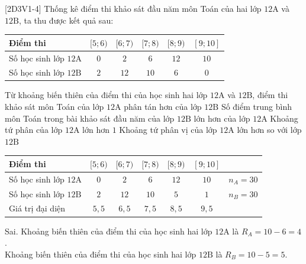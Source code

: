 \begin{ex}%
[2D3V1-4]%
	Thống kê điểm thi khảo sát đầu năm môn Toán của hai lớp $12\mathrm{A}$ và $12\mathrm{B}$, ta thu được kết quả sau: 
	\begin{center}
		\begin{tabular}{|l|c|c|c|c|c|}
			\hline Điểm thi & $[5 ; 6)$ & $[6 ; 7)$ & $[7 ; 8)$ & $[8 ; 9)$ & $[9 ; 10]$ \\
			\hline 
			Số học sinh lớp $12\mathrm{A}$ & $0$ & $2$ & $6$ & $12$ & $10$ \\
			\hline 
			Số học sinh lớp $12\mathrm{B}$ & $2$ & $12$ & $10$ & $6$ & $0$ \\
			\hline
		\end{tabular}
	\end{center}
	\choiceTF
	{Từ khoảng biến thiên của điểm thi của học sinh hai lớp $12\mathrm{A}$ và $12\mathrm{B}$, điểm thi khảo sát môn Toán của lớp $12\mathrm{A}$ phân tán hơn của lớp $12\mathrm{B}$}
	{Số điểm trung bình môn Toán trong bài khảo sát đầu năm của lớp $12\mathrm{B}$ lớn hơn của lớp $12\mathrm{A}$}
	{\True Khoảng tứ phân của lớp $12\mathrm{A}$ lớn hơn $1$}
	{\True Khoảng tứ phân vị của lớp $12\mathrm{A}$ lớn hơn so với lớp $12\mathrm{B}$}
	\loigiai
	{
		\begin{center}
			\begin{tabular}{|l|c|c|c|c|c|c|}
				\hline Điểm thi & $[5 ; 6)$ & $[6 ; 7)$ & $[7 ; 8)$ & $[8 ; 9)$ & $[9 ; 10]$ & \\
				\hline 
				Số học sinh lớp $12\mathrm{A}$ & $0$ & $2$ & $6$ & $12$ & $10$ & $n_A=30$ \\
				\hline
				Số học sinh lớp $12\mathrm{B}$ & $2$ & $12$ & $10$ & $5$ & $1$ & $n_B=30$ \\
				\hline 
				Giá trị đại diện & $5{,}5$ & $6{,}5$ & $7{,}5$ & $8{,}5$ & $9{,}5$ & \\
				\hline
			\end{tabular}
		\end{center}
		\begin{itemchoice}
			\itemch Sai. Khoảng biến thiên của điểm thi của học sinh hai lớp $12\mathrm{A}$ là $R_A=10-6=4$.\\
			Khoảng biến thiên của điểm thi của học sinh hai lớp $12\mathrm{B}$ là $R_B=10-5=5$.

\end{itemchoice}}
\end{ex}
